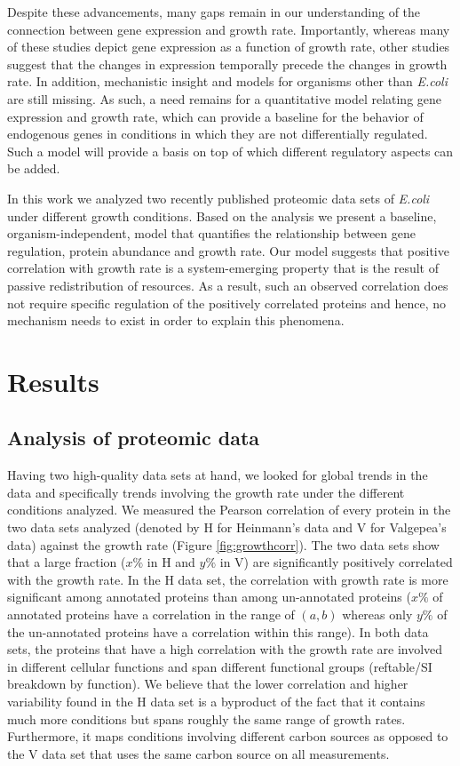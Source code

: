 \documentclass[notitlepage]{article}
\begin{document}
Despite these advancements, many gaps remain in our understanding of the connection between gene expression and growth rate.
Importantly, whereas many of these studies depict gene expression as a function of growth rate, other studies suggest that the changes in expression temporally precede the changes in growth rate\parencite{levy2007}.
In addition, mechanistic insight and models for organisms other than \emph{E.coli} are still missing.
As such, a need remains for a quantitative model relating gene expression and growth rate, which can provide a baseline for the behavior of endogenous genes in conditions in which they are not differentially regulated.
Such a model will provide a basis on top of which different regulatory aspects can be added.

In this work we analyzed two recently published proteomic data sets of \emph{E.coli} under different growth conditions.
Based on the analysis we present a baseline, organism-independent, model that quantifies the relationship between gene regulation, protein abundance and growth rate.
Our model suggests that positive correlation with growth rate is a system-emerging property that is the result of passive redistribution of resources.
As a result, such an observed correlation does not require specific regulation of the positively correlated proteins and hence, no mechanism needs to exist in order to explain this phenomena.

\section{Results}
\subsection{Analysis of proteomic data}
Having two high-quality data sets at hand, we looked for global trends in the data and specifically trends involving the growth rate under the different conditions analyzed.
We measured the Pearson correlation of every protein in the two data sets analyzed (denoted by H for Heinmann's data and V for Valgepea's data) against the growth rate (Figure \ref{fig:growthcorr}).
The two data sets show that a large fraction ($x\% $ in H and $y\% $ in V) are significantly positively correlated with the growth rate.
In the H data set, the correlation with growth rate is more significant among annotated proteins than among un-annotated proteins ($x\% $ of annotated proteins have a correlation in the range of $(a,b)$ whereas only $y\% $ of the un-annotated proteins have a correlation within this range).
In both data sets, the proteins that have a high correlation with the growth rate are involved in different cellular functions and span different functional groups (reftable/SI breakdown by function).
We believe that the lower correlation and higher variability found in the H data set is a byproduct of the fact that it contains much more conditions but spans roughly the same range of growth rates.
Furthermore, it maps conditions involving different carbon sources as opposed to the V data set that uses the same carbon source on all measurements.
\end{document}
